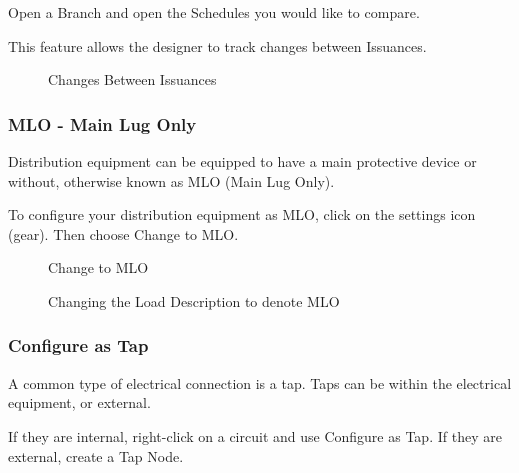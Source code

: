 \documentclass[letterpaper,10pt,english]{sphinxmanual}
\begin{document}
Open a Branch and open the Schedules you would like to compare.

This feature allows the designer to track changes between Issuances.

\begin{figure}[H]
\centering
\capstart

\noindent{}
\caption{Changes Between Issuances}\label{\detokenize{docs/userguide/buildingelectricalmodel/schedules/index-schedules:id17}}\end{figure}


\subsubsection{MLO - Main Lug Only}
\label{\detokenize{docs/userguide/buildingelectricalmodel/schedules/index-schedules:mlo-main-lug-only}}
Distribution equipment can be equipped to have a main protective device or without, otherwise known as MLO (Main Lug Only).

To configure your distribution equipment as MLO, click on the settings icon (gear).  Then choose Change to MLO.

\begin{figure}[H]
\centering
\capstart

\noindent{}
\caption{Change to MLO}\label{\detokenize{docs/userguide/buildingelectricalmodel/schedules/index-schedules:id18}}\end{figure}

\begin{figure}[H]
\centering
\capstart

\noindent{}
\caption{Changing the Load Description to denote MLO}\label{\detokenize{docs/userguide/buildingelectricalmodel/schedules/index-schedules:id19}}\end{figure}


\subsubsection{Configure as Tap}
\label{\detokenize{docs/userguide/buildingelectricalmodel/schedules/index-schedules:configure-as-tap}}
A common type of electrical connection is a tap.  Taps can be within the electrical equipment, or external.

If they are internal, right-click on a circuit and use Configure as Tap.  If they are external, create a Tap Node.
\end{document}

